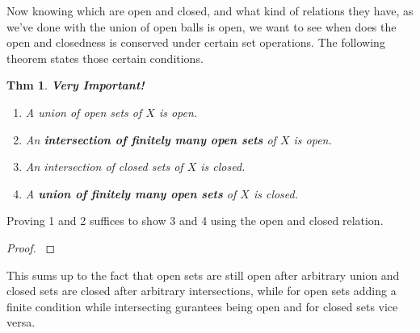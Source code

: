 \documentclass[paper=a4, fontsize=11pt]{scrartcl}
\newtheorem{theorem}{Thm}
\begin{document}
Now knowing which are open and closed, and what kind of relations they have, as we've done with the union of open balls is open, we want to see when does the open and closedness is conserved under certain set operations. The following theorem states those certain conditions.\\

\begin{theorem}
\textbf{Very Important!} 
\begin{enumerate}
	\item A union of open sets of $X$ is open.
	\item An \textbf{intersection of finitely many open sets} of $X$ is open.
	\item An intersection of closed sets of $X$ is closed.
	\item A \textbf{union of finitely many open sets} of $X$ is closed. \\
\end{enumerate}
\end{theorem}

Proving 1 and 2 suffices to show 3 and 4 using the open and closed relation. \\

\begin{proof}
$ $ \newline
\vspace{-0.15in}
\end{proof}

This sums up to the fact that open sets are still open after arbitrary union and closed sets are closed after arbitrary intersections, while for open sets adding a finite condition while intersecting gurantees being open and for closed sets vice versa. \\
\end{document}
